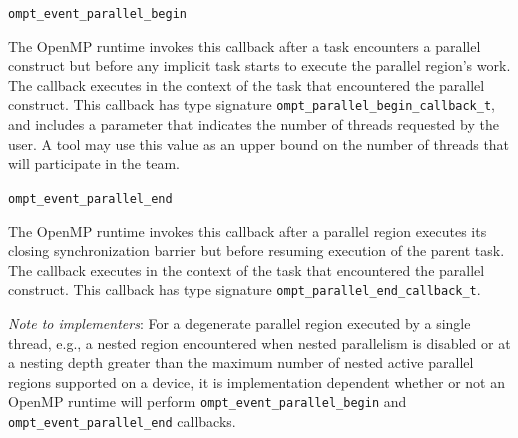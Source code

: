 \documentclass{article}
\newcommand{\descheader}[1]{{\needspace{3\baselineskip}\vspace{1em}\noindent \fbox{#1}}}
\begin{document}
\begin{description}

\item \lstinline|ompt_event_parallel_begin|

\sloppy
The OpenMP runtime invokes this callback 
after a task encounters a parallel construct
but before any implicit task starts to execute the
parallel region's work. The callback executes in the context of the task that encountered the parallel construct.
This callback has type signature \lstinline|ompt_parallel_begin_callback_t|, and includes a parameter that indicates the number of threads requested by the user. 
A tool may use this value as an upper bound on the number of threads that will participate in the team.



\item \lstinline|ompt_event_parallel_end|

The OpenMP runtime invokes this callback 
after a parallel
region executes its closing synchronization barrier but before
resuming execution of the parent task.  The callback executes in
the context of the task that encountered the parallel construct.
This callback has type signature \lstinline|ompt_parallel_end_callback_t|. 

\end{description}

\noindent
{\em Note to implementers}: For a degenerate parallel region executed by a single thread, e.g.,
a nested region encountered when nested parallelism is disabled or at a nesting depth greater than the 
maximum number of nested active parallel regions supported on a device, 
it is implementation dependent whether or not an OpenMP runtime will perform
 \lstinline|ompt_event_parallel_begin| and \lstinline|ompt_event_parallel_end| callbacks.

\descheader{Tasks}
\end{document}
